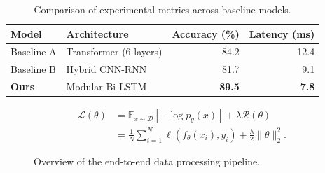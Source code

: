 
\begin{table}[htbp]
  \centering
  \caption{Comparison of experimental metrics across baseline models.}
  \label{tab:baseline_comparison}
  \begin{tabularx}{\linewidth}{l X r r}
    \toprule
    \textbf{Model} & \textbf{Architecture} & \textbf{Accuracy (\%)} & \textbf{Latency (ms)} \\
    \midrule
    Baseline A     & Transformer (6 layers) & 84.2                    & 12.4                  \\
    Baseline B     & Hybrid CNN-RNN         & 81.7                    & 9.1                   \\
    \textbf{Ours}  & Modular Bi-LSTM        & \textbf{89.5}           & \textbf{7.8}          \\
    \bottomrule
  \end{tabularx}
\end{table}

\begin{align}
  \label{eq:optimization_objective}
  \mathcal{L}(\theta) &= \mathbb{E}_{x \sim \mathcal{D}} \left[ -\log p_\theta(x) \right] + \lambda \mathcal{R}(\theta) \\
  &= \frac{1}{N} \sum_{i=1}^{N} \ell(f_\theta(x_i), y_i) + \frac{\lambda}{2} \|\theta\|_2^2.
\end{align}

\begin{figure}[htbp]
  \centering
  \caption{Overview of the end-to-end data processing pipeline.}
  \label{fig:pipeline_overview}
\end{figure}

